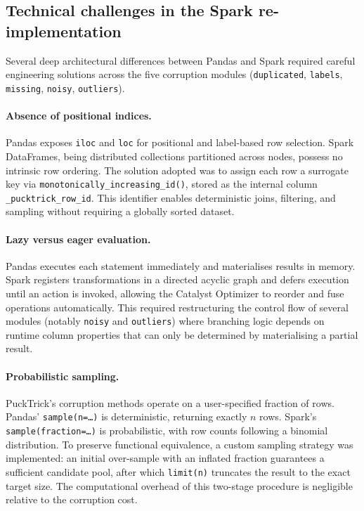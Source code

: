 \documentclass{article}
\begin{document}
\subsection{Technical challenges in the Spark re-implementation}

Several deep architectural differences between Pandas and Spark required careful engineering solutions across the five corruption modules (\texttt{duplicated}, \texttt{labels}, \texttt{missing}, \texttt{noisy}, \texttt{outliers}).

\paragraph{Absence of positional indices.}
Pandas exposes \texttt{iloc} and \texttt{loc} for positional and label-based row selection. Spark DataFrames, being distributed collections partitioned across nodes, possess no intrinsic row ordering. The solution adopted was to assign each row a surrogate key via \texttt{monotonically\_increasing\_id()}, stored as the internal column \texttt{\_pucktrick\_row\_id}. This identifier enables deterministic joins, filtering, and sampling without requiring a globally sorted dataset.

\paragraph{Lazy versus eager evaluation.}
Pandas executes each statement immediately and materialises results in memory. Spark registers transformations in a directed acyclic graph and defers execution until an action is invoked, allowing the Catalyst Optimizer to reorder and fuse operations automatically. This required restructuring the control flow of several modules (notably \texttt{noisy} and \texttt{outliers}) where branching logic depends on runtime column properties that can only be determined by materialising a partial result.

\paragraph{Probabilistic sampling.}
PuckTrick's corruption methods operate on a user-specified fraction of rows. Pandas' \texttt{sample(n=\ldots)} is deterministic, returning exactly $n$ rows. Spark's \texttt{sample(fraction=\ldots)} is probabilistic, with row counts following a binomial distribution. To preserve functional equivalence, a custom sampling strategy was implemented: an initial over-sample with an inflated fraction guarantees a sufficient candidate pool, after which \texttt{limit(n)} truncates the result to the exact target size. The computational overhead of this two-stage procedure is negligible relative to the corruption cost.
\end{document}
